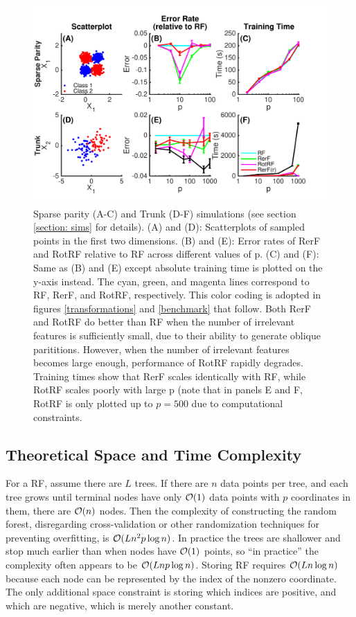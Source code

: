 \documentclass[10pt]{article}
\begin{document}
\begin{figure}[ht]
\vskip 0.2in
\begin{center}
\centerline{\includegraphics[width=\columnwidth]{../Figures/pdf/Fig2_simulations}}
\caption{Sparse parity (A-C) and Trunk (D-F) simulations (see section \ref{section: sims} for details). (A) and (D): Scatterplots of sampled points in the first two dimensions. (B) and (E): Error rates of RerF and RotRF relative to RF across different values of p. (C) and (F): Same as (B) and (E) except absolute training time is plotted on the y-axis instead. The cyan, green, and magenta lines correspond to RF, RerF, and RotRF, respectively. This color coding is adopted in figures \ref{transformations} and \ref{benchmark} that follow. Both RerF and RotRF do better than RF when the number of irrelevant features is sufficiently small, due to their ability to generate oblique parititions. However, when the number of irrelevant features becomes large enough, performance of RotRF rapidly degrades. Training times show that RerF scales identically with RF, while RotRF scales poorly with large p (note that in panels E and F, RotRF is only plotted up to $p = 500$ due to computational constraints.}
\label{simulations}
\end{center}
\vskip -0.2in
\end{figure}

\subsection{Theoretical Space and Time Complexity}

For a RF, assume there are $L$ trees.  
If there are $n$ data points per tree, and each tree grows until terminal nodes have only $\mathcal{O}(1)$ data points with $p$ coordinates in them, there are $\mathcal{O}(n)$ nodes.
Then the complexity of constructing the random forest, disregarding cross-validation or other randomization techniques for preventing overfitting, is $\mathcal{O}(Ln^2p\log n)$. In practice the trees are shallower and stop much earlier than when nodes have $\mathcal{O}(1)$ points, so ``in practice'' the complexity often appears to be $\mathcal{O}(Lnp\log n)$. Storing RF requires $\mathcal{O}(L n\log n )$ because each node can be represented by the index of the nonzero coordinate. The only additional space constraint is storing which indices are positive, and which are negative, which is merely another constant.
\end{document}
